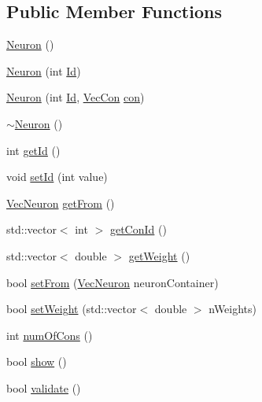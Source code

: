 \subsection*{Public Member Functions}
\begin{DoxyCompactItemize}
\item 
\hyperlink{class_neuron_a823487d01615fadb8ac19a2768dd9d96}{Neuron} ()
\item 
\hyperlink{class_neuron_a05698a11ac18b6cee34d18f63681ddcc}{Neuron} (int \hyperlink{class_neuron_a72bb327a7c5c865e6748a4e074ce0680}{Id})
\item 
\hyperlink{class_neuron_a46e54e28867b0ffb90b829e8c192a0c2}{Neuron} (int \hyperlink{class_neuron_a72bb327a7c5c865e6748a4e074ce0680}{Id}, \hyperlink{class_vec_con}{VecCon} \hyperlink{class_neuron_a1451f2424a8f9e46ca643d03ff98a616}{con})
\item 
\hyperlink{class_neuron_a94a250ce7e167760e593979b899745b1}{$\sim$Neuron} ()
\item 
int \hyperlink{class_neuron_ad9211d55ea50ad6dfbd2676b9e2335e4}{getId} ()
\item 
void \hyperlink{class_neuron_aa93290c13b40c5b07d92f272a0a2ce63}{setId} (int value)
\item 
\hyperlink{class_vec_neuron}{VecNeuron} \hyperlink{class_neuron_a49a8d313aacc9b2f737343e1c3be75dc}{getFrom} ()
\item 
std::vector$<$ int $>$ \hyperlink{class_neuron_aac7d538b4a5087f730ba80f19852bced}{getConId} ()
\item 
std::vector$<$ double $>$ \hyperlink{class_neuron_a3349c0a2053e35afa5b7036bb816f8c6}{getWeight} ()
\item 
bool \hyperlink{class_neuron_a2aa3a89c77ac950559689d6d48a044f9}{setFrom} (\hyperlink{class_vec_neuron}{VecNeuron} neuronContainer)
\item 
bool \hyperlink{class_neuron_a93b27c179c576758ff437b9273b95041}{setWeight} (std::vector$<$ double $>$ nWeights)
\item 
int \hyperlink{class_neuron_ae447dce39ed04581609a83d742b585d1}{numOfCons} ()
\item 
bool \hyperlink{class_neuron_a255c3597520c730d798218f7174eff1b}{show} ()
\item 
bool \hyperlink{class_neuron_a95327aa80a9ec949491f214a0c159b5a}{validate} ()
\end{DoxyCompactItemize}
